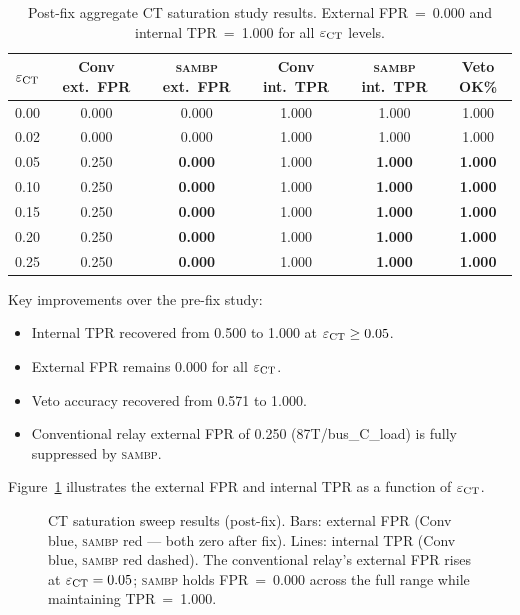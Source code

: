 \documentclass[12pt,a4paper]{article}
\newcommand{\SAMBP}{\textsc{sambp}}
\newcommand{\epsct}{\varepsilon_{\rm CT}}
\begin{document}
\begin{table}[ht]
\centering
\caption{Post-fix aggregate CT saturation study results.
  External FPR~=~0.000 and internal TPR~=~1.000 for all $\epsct$ levels.}
\label{tab:postfix}
\begin{tabular}{cccccc}
\toprule
$\epsct$ & Conv ext.\ FPR & \SAMBP{} ext.\ FPR &
           Conv int.\ TPR & \SAMBP{} int.\ TPR & Veto OK\% \\
\midrule
0.00 & 0.000 & 0.000 & 1.000 & 1.000 & 1.000 \\
0.02 & 0.000 & 0.000 & 1.000 & 1.000 & 1.000 \\
0.05 & 0.250 & \textbf{0.000} & 1.000 & \textbf{1.000} & \textbf{1.000} \\
0.10 & 0.250 & \textbf{0.000} & 1.000 & \textbf{1.000} & \textbf{1.000} \\
0.15 & 0.250 & \textbf{0.000} & 1.000 & \textbf{1.000} & \textbf{1.000} \\
0.20 & 0.250 & \textbf{0.000} & 1.000 & \textbf{1.000} & \textbf{1.000} \\
0.25 & 0.250 & \textbf{0.000} & 1.000 & \textbf{1.000} & \textbf{1.000} \\
\bottomrule
\end{tabular}
\end{table}

Key improvements over the pre-fix study:
\begin{itemize}[noitemsep]
  \item Internal TPR recovered from 0.500 to 1.000 at $\epsct \geq 0.05$.
  \item External FPR remains 0.000 for all $\epsct$.
  \item Veto accuracy recovered from 0.571 to 1.000.
  \item Conventional relay external FPR of 0.250 (87T/bus\_C\_load) is
    fully suppressed by \SAMBP{}.
\end{itemize}

Figure~\ref{fig:sweep} illustrates the external FPR and internal TPR
as a function of $\epsct$.

\begin{figure}[ht]
  \centering
  
  \caption{CT saturation sweep results (post-fix).
    Bars: external FPR (Conv blue, \SAMBP{} red — both zero after fix).
    Lines: internal TPR (Conv blue, \SAMBP{} red dashed).
    The conventional relay's external FPR rises at $\epsct = 0.05$;
    \SAMBP{} holds FPR~=~0.000 across the full range while maintaining
    TPR~=~1.000.}
  \label{fig:sweep}
\end{figure}
\end{document}
